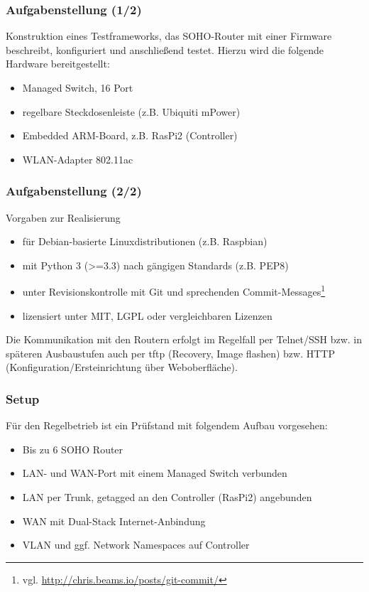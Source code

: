 \documentclass[accentcolor=tud6b,colorbacktitle,inverttitle,landscape,german,presentation,t]{tudbeamer}
\begin{document}
	\begin{frame}
		\frametitle{Aufgabenstellung (1/2)}
		    Konstruktion eines Testframeworks, das SOHO-Router mit einer Firmware beschreibt,
		    konfiguriert und anschließend testet.
		    \vfill
		    Hierzu wird die folgende Hardware bereitgestellt:
		    \begin{itemize}
			    \item Managed Switch, 16 Port
			    \item regelbare Steckdosenleiste (z.B. Ubiquiti mPower)
			    \item Embedded ARM-Board, z.B. RasPi2 (Controller)
			    \item WLAN-Adapter 802.11ac
		    \end{itemize}
	\end{frame}
	
	\begin{frame}
		\frametitle{Aufgabenstellung (2/2)}
		\vfill
		Vorgaben zur Realisierung
		\begin{itemize}
			\item für Debian-basierte Linuxdistributionen (z.B. Raspbian)
			\item mit Python 3 (>=3.3) nach gängigen Standards (z.B. PEP8)
			\item unter Revisionskontrolle mit Git und sprechenden Commit-Messages\footnote{vgl. \url{http://chris.beams.io/posts/git-commit/}}
			\item lizensiert unter MIT, LGPL oder vergleichbaren Lizenzen
		\end{itemize}
		\vfill
		Die Kommunikation mit den Routern erfolgt im Regelfall per Telnet/SSH bzw. in späteren Ausbaustufen auch per tftp (Recovery, Image flashen) bzw. HTTP (Konfiguration/Ersteinrichtung über
		Weboberfläche).
		\vfill
	\end{frame}
	
	\begin{frame}
		\frametitle{Setup}
		    \vfill
		    Für den Regelbetrieb ist ein Prüfstand mit folgendem Aufbau vorgesehen:
		    \vfill
			\begin{itemize}
			    \item Bis zu 6 SOHO Router
		    	\item LAN- und WAN-Port mit einem Managed Switch verbunden
			    \item LAN per Trunk, getagged an den Controller (RasPi2) angebunden
			    \item WAN mit Dual-Stack Internet-Anbindung
			    \item VLAN und ggf. Network Namespaces auf Controller
		    \end{itemize}
			\vfill
	\end{frame}
\end{document}
